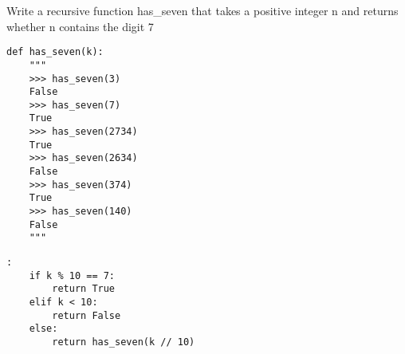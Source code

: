 \begin{blocksection}
\question Write a recursive function has\_seven that takes a positive integer n and returns whether n contains the digit 7

\begin{lstlisting}
def has_seven(k):
    """
    >>> has_seven(3)
    False
    >>> has_seven(7)
    True
    >>> has_seven(2734)
    True
    >>> has_seven(2634)
    False
    >>> has_seven(374)
    True
    >>> has_seven(140)
    False
    """
\end{lstlisting}

\begin{solution}[1in]
\begin{lstlisting}:
    if k % 10 == 7:
        return True
    elif k < 10:
        return False
    else:
        return has_seven(k // 10)
\end{lstlisting}
\end{solution}
\end{blocksection}

